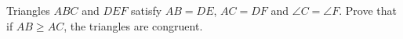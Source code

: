 Triangles $ABC$ and $DEF$ satisfy $AB=DE$, $AC=DF$ and $\angle C=\angle F$. Prove that if $AB\ge AC$, the triangles are congruent.
